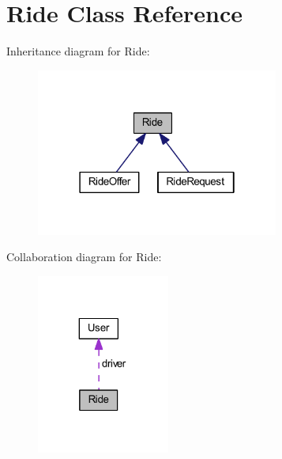 \hypertarget{class_ride}{}\section{Ride Class Reference}
\label{class_ride}


Inheritance diagram for Ride\+:\nopagebreak
\begin{figure}[H]
\begin{center}
\leavevmode
\includegraphics[width=226pt]{class_ride__inherit__graph}
\end{center}
\end{figure}


Collaboration diagram for Ride\+:\nopagebreak
\begin{figure}[H]
\begin{center}
\leavevmode
\includegraphics[width=124pt]{class_ride__coll__graph}
\end{center}
\end{figure}
